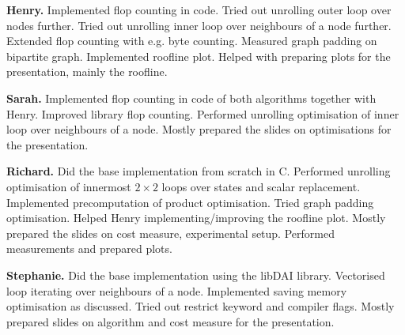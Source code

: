 \documentclass[draft,letterpaper]{article}
\newcommand{\mypar}[1]{{\bf #1.}}
\begin{document}


\mypar{Henry} Implemented flop counting in code. Tried out unrolling outer loop over nodes further. Tried out unrolling inner loop over neighbours of a node further. Extended flop counting with e.g. byte counting. Measured graph padding on bipartite graph. Implemented roofline plot. Helped with preparing plots for the presentation, mainly the roofline.

\mypar{Sarah} Implemented flop counting in code of both algorithms together with Henry. Improved library flop counting. Performed unrolling optimisation of inner loop over neighbours of a node. Mostly prepared the slides on optimisations for the presentation.

\mypar{Richard} Did the base implementation from scratch in C.
Performed unrolling optimisation of innermost $2\times2$ loops over states and scalar replacement. Implemented precomputation of product optimisation. Tried graph padding optimisation. Helped Henry implementing/improving the roofline plot. Mostly prepared the slides on cost measure, experimental setup. Performed measurements and prepared plots.

\mypar{Stephanie} Did the base implementation using the libDAI library. Vectorised loop iterating over neighbours of a node. Implemented saving memory optimisation as discussed. Tried out restrict keyword and compiler flags. Mostly prepared slides on algorithm and cost measure for the presentation.
\end{document}
